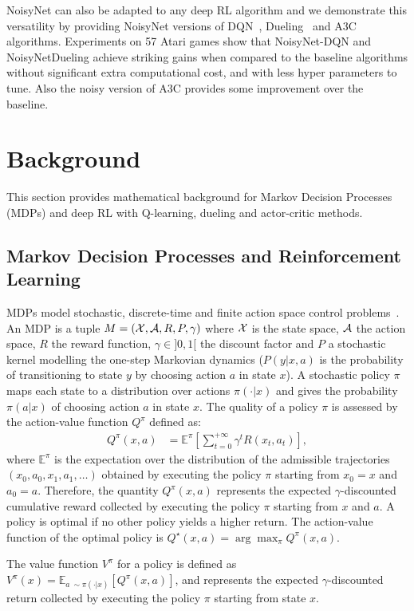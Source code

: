 \documentclass{article}
\newcommand{\algoinit}{NoisyNet}
\begin{document}
NoisyNet can also be adapted to any deep RL algorithm and we demonstrate this versatility by providing \algoinit{} versions of DQN~\citep{mnih2015human}, Dueling~\citep{wang2016Dueling} and A3C~\citep{mnih2016asynchronous} algorithms. Experiments on 57 Atari games show that NoisyNet-DQN and NoisyNetDueling achieve striking gains when compared to the baseline algorithms without significant extra computational cost, and with less hyper parameters to tune. Also the noisy version of A3C provides some improvement over the baseline.
%
\section{Background}
\label{sec:background}
This section provides mathematical background for Markov Decision Processes (MDPs) and deep RL with Q-learning, dueling and actor-critic methods.
\subsection{Markov Decision Processes and Reinforcement Learning}
MDPs model stochastic, discrete-time and finite action space control problems~\citep{bellman1965dynamic,bertsekas1995dynamic,puterman1994markov}.
An MDP is a tuple $M=(\mathcal X,\mathcal A,R,P,\gamma)$ where $\mathcal X$ is the state space, $\mathcal A$ the action space, $R$ the reward function, $\gamma\in ]0,1[$ the discount factor and $P$ a stochastic kernel modelling the one-step Markovian dynamics ($P(y|x,a)$ is the probability of transitioning to state $y$ by choosing action $a$ in state $x$). A stochastic policy $\pi$ maps each state to a distribution over actions $\pi(\cdot|x)$ and gives the probability $\pi(a|x)$ of choosing action $a$ in state $x$. The quality of a policy $\pi$ is assessed by the action-value function $Q^\pi$ defined as:
\begin{align}
Q^\pi(x,a)&=\mathbb{E}^\pi\left[\sum_{t=0}^{+\infty}\gamma^t R(x_t,a_t)\right],
\end{align}
where $\mathbb{E}^\pi$ is the expectation over the distribution of the admissible trajectories $(x_0,a_0,x_1, a_1,\dots)$ obtained by executing the policy $\pi$ starting from $x_0=x$ and $a_0=a$. Therefore, the quantity $Q^\pi(x,a)$ represents the expected $\gamma$-discounted cumulative reward collected by executing the policy $\pi$ starting from $x$ and $a$.
A policy is optimal if no other policy yields a higher return.
The action-value function of the optimal policy is $Q^\star(x, a) = \arg\max_\pi Q^\pi(x,a)$.

The value function $V^\pi$ for a policy is defined as $V^\pi(x)=\mathbb{E}_{a~\sim\pi(\cdot|x)}[Q^\pi(x,a)]$, and represents the expected $\gamma$-discounted return collected by executing the policy $\pi$ starting from state $x$.
\end{document}
